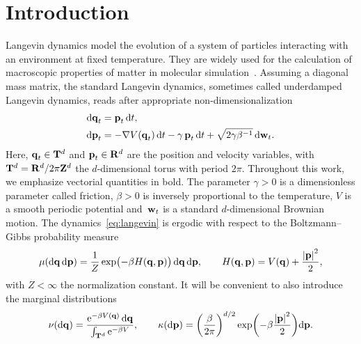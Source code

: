 \documentclass[11pt,a4paper]{article}
\begin{document}
\section{Introduction}%
\label{sec:introduction}
Langevin dynamics model the evolution of a system of particles interacting with an environment at fixed temperature.
They are widely used for the calculation of macroscopic properties of matter in molecular simulation~\cite{MR2723222,allen2017computer}.
Assuming a diagonal mass matrix,
the standard Langevin dynamics, sometimes called underdamped Langevin dynamics,
reads after appropriate non-dimensionalization~\cite[Section 2.2.4]{MR2681239}
\begin{subequations}
\label{eq:langevin}
\begin{align}
    \label{eq:langevin_q}
    \mathrm d \boldsymbol{\mathbf q}_t &= \boldsymbol{\mathbf p}_t \, \mathrm d t, \\
    \label{eq:langevin_p}
    \mathrm d \boldsymbol{\mathbf p}_t &= - \nabla V(\boldsymbol{\mathbf q}_t) \, \mathrm d t - \gamma \, \boldsymbol{\mathbf p}_t \, \mathrm d t + \sqrt{2 \gamma \beta^{-1}} \, \mathrm d \boldsymbol{\mathbf w}_t.
\end{align}
\end{subequations}
Here, $\boldsymbol{\mathbf q}_t \in \mathbf T^d$ and $\boldsymbol{\mathbf p}_t \in \mathbf R^d$ are the position and velocity variables,
with~$\mathbf T^d = \mathbf R^d / 2\pi \mathbf Z^d$ the $d$-dimensional torus with period $2 \pi$.
Throughout this work, we emphasize vectorial quantities in bold.
The parameter $\gamma > 0$ is a dimensionless parameter called friction,
$\beta > 0$ is inversely proportional to the temperature,
$V$ is a smooth periodic potential
and~$\boldsymbol{\mathbf w}_t$ is a standard $d$-dimensional Brownian motion.
The dynamics~\eqref{eq:langevin} is ergodic with respect to the Boltzmann--Gibbs probability measure
\begin{equation}
    \label{eq:invariant_measure}
    \mu(\d \vect q \, \d \vect p) = \frac{1}{Z} \exp \bigl( - \beta H(\vect q, \vect p)  \bigr) \, \d \vect q \, \d \vect p,
    \qquad H(\vect q, \vect p) = V(\vect q) + \frac{\abs{\vect p}^2}{2},
\end{equation}
with $Z< \infty$ the normalization constant.
It will be convenient to also introduce the marginal distributions
\begin{equation}
    \label{eq:definition_prob_measures}
    \nu(\d \vect q) = \frac{\e^{- \beta V(\vect q)} \, \d \vect q}{\int_{\torus^d}\e^{-\beta V}},
    \qquad \kappa(\d \vect p) = \left( \frac{\beta}{2 \pi} \right)^{d/2}\exp \biggl( - \beta \frac{\abs*{\vect p}^2}{2} \biggr) \d \vect p.
\end{equation}
\end{document}
